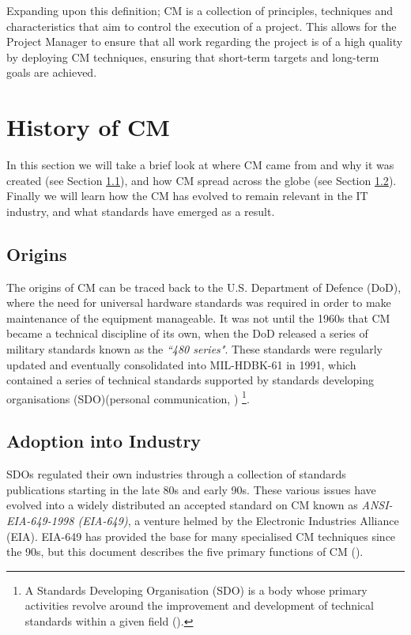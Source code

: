 \documentclass[cmpstyle]{ueacmpstyle}
\begin{document}
		Expanding upon this definition; CM is a collection of principles, techniques and characteristics that aim to control the execution of a project. This allows for the Project Manager to ensure that all work regarding the project is of a high quality by deploying CM techniques, ensuring that short-term targets and long-term goals are achieved.
	
	\section{History of CM} \label{sec:history}
	In this section we will take a brief look at where CM came from and why it was created (see Section \ref{sec:origin}), and how CM spread across the globe (see Section \ref{sec:adoption}). Finally we will learn how the CM has evolved to remain relevant in the IT industry, and what standards have emerged as a result.
	
		\subsection{Origins} \label{sec:origin}
		The origins of CM can be traced back to the U.S. Department of Defence (DoD), where the need for universal hardware standards was required in order to make maintenance of the equipment manageable. It was not until the 1960s that CM became a technical discipline of its own, when the DoD released a series of military standards known as the \emph{``480 series"}. These standards were regularly updated and eventually consolidated into MIL-HDBK-61 in 1991, which contained a series of technical standards supported by standards developing organisations (SDO)(personal communication, \cite{dod-history}) \footnote{A Standards Developing Organisation (SDO) is a body whose primary activities revolve around the improvement and development of technical standards within a given field (\cite{history-standards}).}.
		
		\subsection{Adoption into Industry} \label{sec:adoption}
		SDOs regulated their own industries through a collection of standards publications starting in the late 80s and early 90s. These various issues have evolved into a widely distributed an accepted standard on CM known as \emph{ANSI-EIA-649-1998 (EIA-649)}, a venture helmed by the Electronic Industries Alliance (EIA). EIA-649 has provided the base for many specialised CM techniques since the 90s, but this document describes the five primary functions of CM (\cite{EIA-649}). 
		
\end{document}
